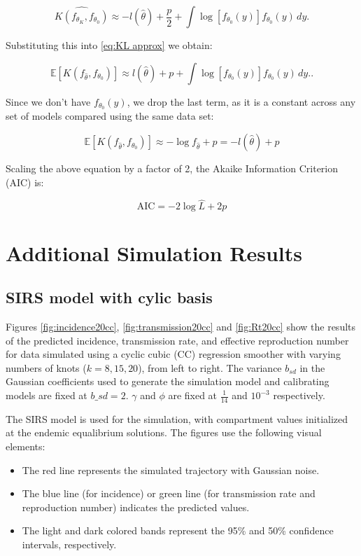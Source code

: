 \documentclass[
11pt, %
oneside, %
english, %
singlespacing, %
]{macthesis} %
\def\tightlist{}
\begin{document}
\[ 
\widehat{K(f_{\theta_K}, f_{\theta_0})}
 \approx -l(\hat{\theta}) + \frac{p}{2} + \int \log[f_{\theta_0}(y)] f_{\theta_0}(y) \, dy. 
\]

Substituting this into \ref{eq:KL approx} we obtain:

\[
\mathbb{E}[K(f_{\hat{\theta}}, f_{\theta_0})] \approx  l({\hat{\theta}}) + p+ \int \log[f_{\theta_0}(y)] f_{\theta_0}(y) \, dy. .
\]

Since we don't have \(f_{\theta_0}(y)\), we drop the last term, as it is a constant across any set of models compared using the same data set:

\[
\mathbb{E}[K(f_{\hat{\theta}}, f_{\theta_0})] \approx -\log f_{\hat{\theta}} + p = -l(\hat{\theta}) + p
\]

Scaling the above equation by a factor of 2, the Akaike Information Criterion (AIC) is:

\begin{equation}
\text{AIC} = -2 \log \hat{L} + 2p
\label{eq:AIC}
\end{equation}

\chapter{Additional Simulation Results}\label{Appendix-results}

\section{SIRS model with cylic basis}\label{Appendix-results-sim}

Figures \ref{fig:incidence20cc}, \ref{fig:transmission20cc} and \ref{fig:Rt20cc} show the results of the predicted incidence, transmission rate, and effective reproduction number for data simulated using a cyclic cubic (CC) regression smoother with varying numbers of knots (\(k = 8, 15, 20\)), from left to right. The variance \(b_{sd}\) in the Gaussian coefficients used to generate the simulation model and calibrating models are fixed at \(b\_sd = 2\). \(\gamma\) and \(\phi\) are fixed at \(\frac{1}{14}\) and \(10^{-3}\) respectively.

The SIRS model is used for the simulation, with compartment values initialized at the endemic equalibrium solutions. The figures use the following visual elements:

\begin{itemize}
\tightlist
\item
  The red line represents the simulated trajectory with Gaussian noise.
\item
  The blue line (for incidence) or green line (for transmission rate and reproduction number) indicates the predicted values.
\item
  The light and dark colored bands represent the 95\% and 50\% confidence intervals, respectively.
\end{itemize}
\end{document}
